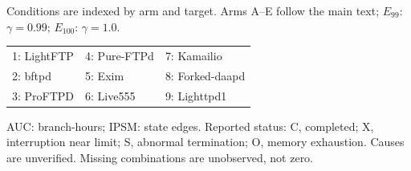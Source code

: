 \begingroup
\small
\setlength{\tabcolsep}{1.6pt}
\renewcommand{\arraystretch}{1.0}
\noindent Conditions are indexed by arm and target. Arms A--E follow the main text; $E_{99}$: $\gamma=0.99$; $E_{100}$: $\gamma=1.0$.
\par\smallskip
\noindent\begin{tabularx}{\columnwidth}{@{}YYY@{}}
1: LightFTP & 4: Pure-FTPd & 7: Kamailio \\
2: bftpd & 5: Exim & 8: Forked-daapd \\
3: ProFTPD & 6: Live555 & 9: Lighttpd1 \\
\end{tabularx}
\par\smallskip
\noindent AUC: branch-hours; IPSM: state edges. Reported status: C, completed; X, interruption near limit; S, abnormal termination; O, memory exhaustion. Causes are unverified. Missing combinations are unobserved, not zero.
\par\smallskip
{}
\label{tab:archive_arms}
\tabletail{\bottomrule}
\tablelasttail{\bottomrule}

